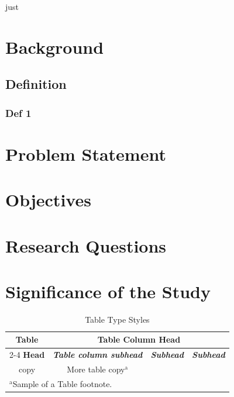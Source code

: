 \documentclass{thesis-library}
\begin{document}
\newpage
{}

\newpage
\Gls{just}
\lipsum[6-7]

\section{Background}
\lipsum[8-9]

\subsection{Definition}
\lipsum[10]

\subsubsection{Def 1}
\lipsum[11]

\section{Problem Statement}
\lipsum[12]

\section{Objectives}
\lipsum[13]

\section{Research Questions}
\lipsum[14]

\section{Significance of the Study}
\lipsum[15]

\lipsum[16]

\lipsum[17-18]

\begin{table}[htbp]
\caption{Table Type Styles}
\begin{center}
\begin{tabular}{|c|c|c|c|}
\hline
\textbf{Table}&\multicolumn{3}{|c|}{\textbf{Table Column Head}} \\
\cline{2-4} 
\textbf{Head} & \textbf{\textit{Table column subhead}}& \textbf{\textit{Subhead}}& \textbf{\textit{Subhead}} \\
\hline
copy& More table copy$^{\mathrm{a}}$& &  \\
\hline
\multicolumn{4}{l}{$^{\mathrm{a}}$Sample of a Table footnote.}
\end{tabular}
\label{tab1}
\end{center}
\end{table}
\end{document}
